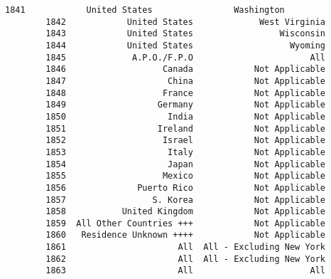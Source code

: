 \documentclass[11pt]{article}
\begin{document}
\begin{Verbatim}[commandchars=\\\{\}]
        1841            United States                Washington   
        1842            United States             West Virginia   
        1843            United States                 Wisconsin   
        1844            United States                   Wyoming   
        1845             A.P.O./F.P.O                       All   
        1846                   Canada            Not Applicable   
        1847                    China            Not Applicable   
        1848                   France            Not Applicable   
        1849                  Germany            Not Applicable   
        1850                    India            Not Applicable   
        1851                  Ireland            Not Applicable   
        1852                   Israel            Not Applicable   
        1853                    Italy            Not Applicable   
        1854                    Japan            Not Applicable   
        1855                   Mexico            Not Applicable   
        1856              Puerto Rico            Not Applicable   
        1857                 S. Korea            Not Applicable   
        1858           United Kingdom            Not Applicable   
        1859  All Other Countries +++            Not Applicable   
        1860   Residence Unknown ++++            Not Applicable   
        1861                      All  All - Excluding New York   
        1862                      All  All - Excluding New York   
        1863                      All                       All   
        

\end{Verbatim}
\end{document}
